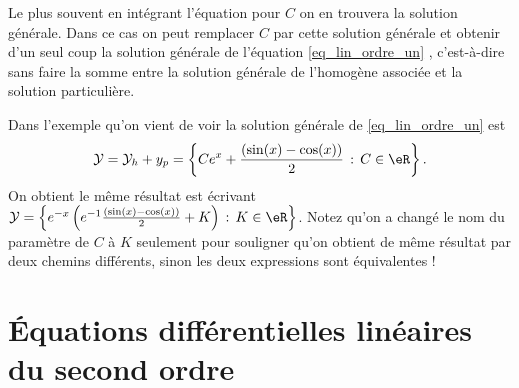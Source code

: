 \begin{remark}
	Le plus souvent en intégrant l'équation pour \( C\) on en trouvera la solution générale. Dans ce cas on peut remplacer \( C\) par cette solution générale et obtenir d'un seul coup la solution générale de l'équation \eqref{eq_lin_ordre_un} , c'est-à-dire sans faire la somme entre la solution générale de l'homogène associée et la solution particulière.

	\begin{example}
		Dans l'exemple qu'on vient de voir la solution générale de \eqref{eq_lin_ordre_un} est
		\begin{equation}
			\mathcal{Y} = \mathcal{Y}_h + y_p = \left\{Ce^x + \frac{(\sin(x)-\cos(x))}{2} \,:\, C\in\eR\right\}.
		\end{equation}
		On obtient le m\^eme résultat est écrivant \( \mathcal{Y} = \left\{e^{-x}\left(e^{-1}\frac{(\sin(x)-\cos(x))}{2} +K \right) \,:\, K\in\eR\right\}\). Notez qu'on a changé le nom du paramètre de \( C\) à \( K\) seulement pour souligner qu'on obtient de m\^eme résultat par deux chemins différents, sinon les deux expressions sont équivalentes !
	\end{example}
\end{remark}

\section{Équations différentielles linéaires du second ordre}
\label{Secordredeux}

